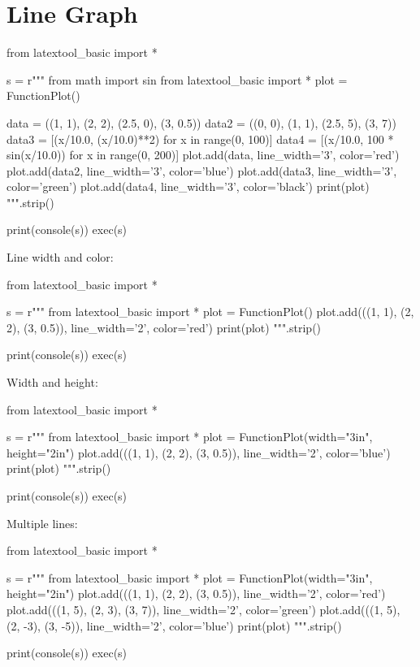 \section{Line Graph}

\begin{python}
from latextool_basic import *

s = r"""
from math import sin
from latextool_basic import *
plot = FunctionPlot()

data = ((1, 1), (2, 2), (2.5, 0), (3, 0.5))
data2 = ((0, 0), (1, 1), (2.5, 5), (3, 7))
data3 = [(x/10.0, (x/10.0)**2) for x in range(0, 100)]
data4 = [(x/10.0, 100 * sin(x/10.0)) for x in range(0, 200)]
plot.add(data, line_width='3', color='red')
plot.add(data2, line_width='3', color='blue')
plot.add(data3, line_width='3', color='green')
plot.add(data4, line_width='3', color='black')
print(plot)
""".strip()

print(console(s))
exec(s)
\end{python}





\newpage
Line width and color:
\begin{python}
from latextool_basic import *

s = r"""
from latextool_basic import *
plot = FunctionPlot()
plot.add(((1, 1), (2, 2), (3, 0.5)), line_width='2', color='red')
print(plot)
""".strip()

print(console(s))
exec(s)
\end{python}



\newpage
Width and height:
\begin{python}
from latextool_basic import *

s = r"""
from latextool_basic import *
plot = FunctionPlot(width="3in", height="2in")
plot.add(((1, 1), (2, 2), (3, 0.5)), line_width='2', color='blue')
print(plot)
""".strip()

print(console(s))
exec(s)
\end{python}



\newpage
Multiple lines:
\begin{python}
from latextool_basic import *

s = r"""
from latextool_basic import *
plot = FunctionPlot(width="3in", height="2in")
plot.add(((1, 1), (2, 2), (3, 0.5)), line_width='2', color='red')
plot.add(((1, 5), (2, 3), (3, 7)), line_width='2', color='green')
plot.add(((1, 5), (2, -3), (3, -5)), line_width='2', color='blue')
print(plot)
""".strip()

print(console(s))
exec(s)
\end{python}



